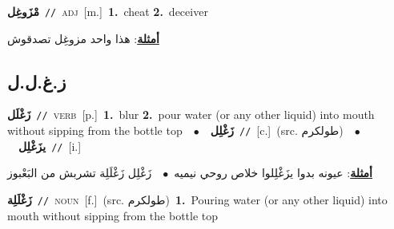 \documentclass[10pt,a4paper,twoside]{article} %
\begin{document}
\begin{multicols}{2}
{\setlength\topsep{0pt}\textbf{\foreignlanguage{arabic}{مْزَوغِل}}\ {\color{gray}\texttt{//}\color{black}}\ \textsc{adj}\ [m.]\ \textbf{1.}~cheat  \textbf{2.}~deceiver\  \begin{flushright}\color{gray}\foreignlanguage{arabic}{\textbf{\underline{\foreignlanguage{arabic}{أمثلة}}}: هذا واحد مزوغِل تصدقوش}\end{flushright}\color{black}} \vspace{2mm}

\vspace{-3mm}
\subsection*{\color{blue}\foreignlanguage{arabic}{ز.غ.ل.ل}\color{blue}{}} 

{\setlength\topsep{0pt}\textbf{\foreignlanguage{arabic}{زَغْلَل}}\ {\color{gray}\texttt{//}\color{black}}\ \textsc{verb}\ [p.]\ \textbf{1.}~blur  \textbf{2.}~pour water (or any other liquid) into mouth without sipping from the bottle top\ \ $\bullet$\ \ \setlength\topsep{0pt}\textbf{\foreignlanguage{arabic}{زَغْلِل}}\ {\color{gray}\texttt{//}\color{black}}\ [c.]\ (src. \color{gray}\foreignlanguage{arabic}{طولكرم}\color{black})\ \ $\bullet$\ \ \setlength\topsep{0pt}\textbf{\foreignlanguage{arabic}{يزَغْلِل}}\ {\color{gray}\texttt{//}\color{black}}\ [i.]\  \begin{flushright}\color{gray}\foreignlanguage{arabic}{\textbf{\underline{\foreignlanguage{arabic}{أمثلة}}}: عيونه بدوا يزَغْلِلوا خلاص روحي نيميه\ $\bullet$\ \  زَغْلِل زَغْلَلِة تشربش من البَعْبوز}\end{flushright}\color{black}} \vspace{2mm}

{\setlength\topsep{0pt}\textbf{\foreignlanguage{arabic}{زَغْلَلِة}}\ {\color{gray}\texttt{//}\color{black}}\ \textsc{noun}\ [f.]\ (src. \color{gray}\foreignlanguage{arabic}{طولكرم}\color{black})\ \textbf{1.}~Pouring water (or any other liquid) into mouth without sipping from the bottle top\ } \vspace{2mm}


\end{multicols}
\end{document}
